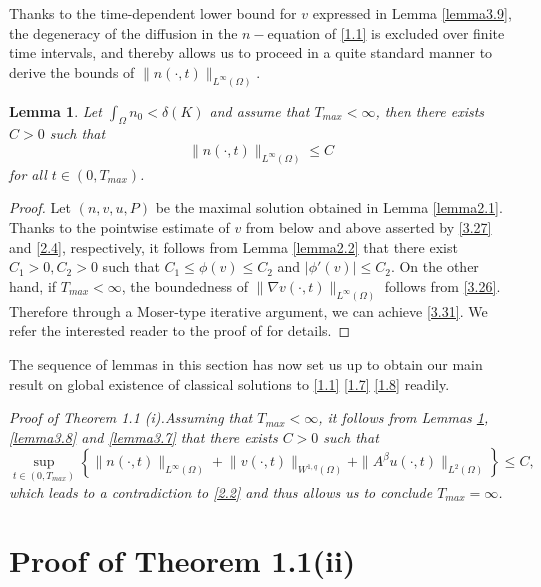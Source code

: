 \documentclass[12pt]{article}
\theoremstyle{plain}
\newtheorem{lemma}{Lemma}[section]
\theoremstyle{definition}
\numberwithin{equation}{section}
\begin{document}
Thanks to the time-dependent lower bound for $v$ expressed in   Lemma \ref{lemma3.9}, the
degeneracy of the diffusion  in  the $n-$equation  of \eqref{1.1} is  excluded over finite time intervals, and thereby allows us to proceed in a quite  standard manner to derive the bounds of $\|n(\cdot,t)\|_{L^\infty(\Omega)}$.


\begin{lemma}\label{lemma3.10} Let $\int_\Omega n_0<\delta(K)$  and assume that $T_{max}<\infty$, then there exists  $C>0$ such that
\begin{equation}\label{3.31}
\|n(\cdot,t)\|_{L^\infty(\Omega)} \leq C
\end{equation}
for all $t\in (0, T_{max})$.
\end{lemma}
\begin{proof}[Proof]Let $(n,v,u,P)$ be the maximal solution obtained in Lemma \ref{lemma2.1}. Thanks to the pointwise estimate of $v$ from below and above asserted by \eqref{3.27} and  \eqref{2.4}, respectively, it follows  from  Lemma \ref{lemma2.2}  that  there exist $C_1>0, C_2>0$ such that $C_1\leq\phi(v)\leq C_2 $ and $|\phi'(v)|\leq C_2$. On the other hand,  if $T_{max}<\infty$, the boundedness of $\| \nabla v(\cdot,t)\|_{L^{\infty}(\Omega)}$ follows from \eqref{3.26}. Therefore through a Moser-type iterative argument, we can achieve \eqref{3.31}. We refer the interested reader to the proof of \cite[Proposition 1.3]{TaoJDE} for details.
\end{proof}

The sequence of lemmas in this section has now set us up to obtain our main result on global existence of classical solutions to \eqref{1.1} \eqref{1.7} \eqref{1.8} readily.

\vspace{.5cm}

\it {Proof of Theorem 1.1 (i).}\rm   \quad Assuming that $T_{max}<\infty$, it  follows from  Lemmas \ref{lemma3.10}, \ref{lemma3.8} and \ref{lemma3.7} that there exists $C>0$ such that
\begin{equation*}
		\sup\limits_{t\in (0, T_{max})}\left\{ \|n(\cdot,t)\|_{L^{\infty}(\Omega)}\!
+\!\|v(\cdot,t)\|_{W^{1,q}(\Omega)}+\|A^\beta u(\cdot,t)\|_{L^2(\Omega)}
\right\}\leq C,
	\end{equation*}
which leads to a contradiction to \eqref{2.2} and thus allows us to conclude $T_{max}=\infty$.

\section{Proof of  Theorem 1.1(ii)}%
\end{document}
